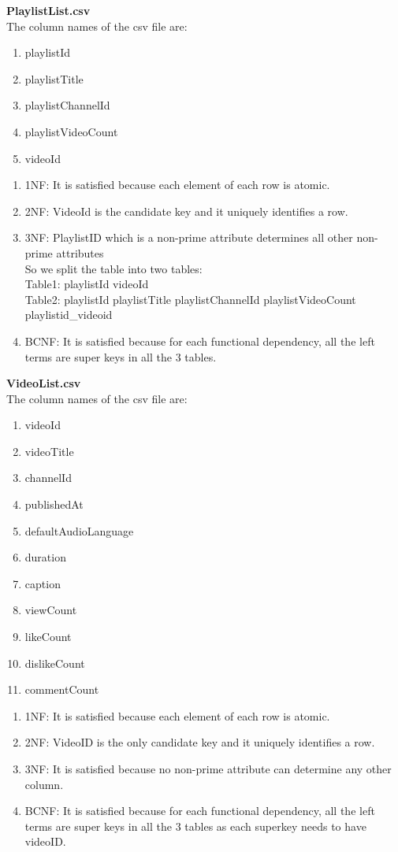 \documentclass[10pt]{article}
\begin{document}
	\textbf{PlaylistList.csv}\\
	The column names of the csv file are:
	\begin{enumerate}
		\item playlistId
		\item playlistTitle
		\item playlistChannelId
		\item playlistVideoCount
		\item videoId
	\end{enumerate}
	\begin{enumerate}
		\item 1NF: It is satisfied  because each element of each row is atomic.
		\item 2NF: VideoId is the candidate key and it uniquely identifies a row.
		\item 3NF: 
		PlaylistID which is a non-prime attribute determines all other non-prime attributes\\
		So we split the table into two tables:\\
		Table1: playlistId	videoId\\
		Table2: playlistId	playlistTitle	playlistChannelId	playlistVideoCount\\
		playlistid\_videoid 
		\item BCNF: It is satisfied because for each functional dependency, all the left terms are super keys in all the 3 tables.
	\end{enumerate}

	\textbf{VideoList.csv}\\
	The column names of the csv file are:
	\begin{enumerate}
		\item videoId
		\item videoTitle
		\item channelId
		\item publishedAt
		\item defaultAudioLanguage
		\item duration
		\item caption
		\item viewCount
		\item likeCount
		\item dislikeCount
		\item commentCount
	\end{enumerate}
	\begin{enumerate}
		\item 1NF: It is satisfied  because each element of each row is atomic.
		\item 2NF: VideoID is the only candidate key and it uniquely identifies a row.
		\item 3NF: It is satisfied because no non-prime attribute can determine any other column.
		\item BCNF: It is satisfied because for each functional dependency, all the left terms are super keys in all the 3 tables as each superkey needs to have videoID.
	\end{enumerate}
\end{document}
